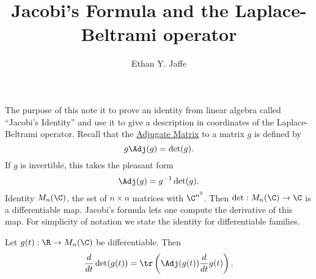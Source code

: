 \documentclass[12pt]{article}
\title{Jacobi's Formula and the Laplace-Beltrami operator}
\author{Ethan Y. Jaffe}
\date{}
\begin{document}
\maketitle
\setcounter{section}{0}
The purpose of this note it to prove an identity from linear algebra called ``Jacobi's Identity'' and use it to give a description in coordinates of the Laplace-Beltrami operator. Recall that the \href{https://en.wikipedia.org/wiki/Adjugate_matrix}{Adjugate Matrix} to a matrix $g$ is defined by
\[g\Adj(g) = \det(g).\]
If $g$ is invertible, this takes the pleasant form
\[\Adj(g) = g^{-1}\det(g).\]
Identity $M_n(\C)$, the set of $n\times n$ matrices with $\C^{n^2}$. Then $\det:M_n(\C) \to \C$ is a differentiable map. Jacobi's formula lets one compute the derivative of this map. For simplicity of notation we state the identity for differentiable families.
\begin{thm}Let $g(t):\R \to M_n(\C)$ be differentiable. Then
\[\frac{d}{dt} \det(g(t)) = \tr\left(\Adj(g(t)) \frac{d}{dt} g(t)\right).\]
\end{thm}
\end{document}
